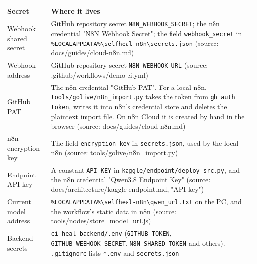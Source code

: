 \documentclass[11pt,a4paper]{report}
\begin{document}
\begin{longtable}{>{\raggedright\arraybackslash}p{0.259\dimexpr\linewidth-4\tabcolsep\relax}>{\raggedright\arraybackslash}p{0.741\dimexpr\linewidth-4\tabcolsep\relax}}
\toprule
\textbf{Secret} & \textbf{Where it lives} \\
\midrule
\endhead
Webhook shared secret & GitHub repository secret \texttt{N8N\_\allowbreak{}WEBHOOK\_\allowbreak{}SECRET}; the n8n credential "N8N Webhook Secret"; the field \texttt{webhook\_\allowbreak{}secret} in \texttt{\%LOCALAPPDATA\%\textbackslash{}selfheal-\allowbreak{}n8n\textbackslash{}secrets.\allowbreak{}json} (source: docs/guides/cloud-n8n.md) \\
Webhook address & GitHub repository secret \texttt{N8N\_\allowbreak{}WEBHOOK\_\allowbreak{}URL} (source: .github/workflows/demo-ci.yml) \\
GitHub PAT & The n8n credential "GitHub PAT". For a local n8n, \texttt{tools/\allowbreak{}golive/\allowbreak{}n8n\_\allowbreak{}import.\allowbreak{}py} takes the token from \texttt{gh auth token}, writes it into n8n's credential store and deletes the plaintext import file. On n8n Cloud it is created by hand in the browser (source: docs/guides/cloud-n8n.md) \\
n8n encryption key & The field \texttt{encryption\_\allowbreak{}key} in \texttt{secrets.\allowbreak{}json}, used by the local n8n (source: tools/golive/n8n\_import.py) \\
Endpoint API key & A constant \texttt{API\_\allowbreak{}KEY} in \texttt{kaggle/\allowbreak{}endpoint/\allowbreak{}deploy\_\allowbreak{}src.\allowbreak{}py}, and the n8n credential "Qwen3.8 Endpoint Key" (source: docs/architecture/kaggle-endpoint.md, "API key") \\
Current model address & \texttt{\%LOCALAPPDATA\%\textbackslash{}selfheal-\allowbreak{}n8n\textbackslash{}qwen\_\allowbreak{}url.\allowbreak{}txt} on the PC, and the workflow's static data in n8n (source: tools/nodes/store\_model\_url.js) \\
Backend secrets & \texttt{ci-\allowbreak{}heal-\allowbreak{}backend/\allowbreak{}.\allowbreak{}env} (\texttt{GITHUB\_\allowbreak{}TOKEN}, \texttt{GITHUB\_\allowbreak{}WEBHOOK\_\allowbreak{}SECRET}, \texttt{N8N\_\allowbreak{}SHARED\_\allowbreak{}TOKEN} and others). \texttt{.\allowbreak{}gitignore} lists \texttt{*.\allowbreak{}env} and \texttt{secrets.\allowbreak{}json} \\
\bottomrule
\end{longtable}
\end{document}
